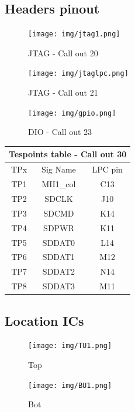 \subsection{Headers pinout}

		\begin{figure}[htbp!]
			\centering
			\texttt{[image: img/jtag1.png]}\\
			\caption{JTAG - Call out 20}
		\end{figure}

		\begin{figure}[htbp!]
			\centering
			\texttt{[image: img/jtaglpc.png]}\\
			\caption{JTAG - Call out  21}
		\end{figure}
		
		\begin{figure}[htbp!]
			\centering
			\texttt{[image: img/gpio.png]}\\
			\caption{DIO - Call out 23}
		\end{figure}

\clearpage


\begin{longtable}{|c|c|c|} \hline
		\multicolumn{3}{|c|}{Tespoints table - Call out 30}\\ \hline
	TPx & Sig Name & LPC pin \\ \hline
	TP1 & MII1\_col & C13 \\ \hline
	TP2 & SDCLK & J10 \\ \hline
	TP3 & SDCMD & K14 \\ \hline
	TP4 & SDPWR & K11 \\ \hline
	TP5 & SDDAT0 & L14 \\ \hline
	TP6 & SDDAT1 & M12 \\ \hline
	TP7 & SDDAT2 & N14 \\ \hline
	TP8 & SDDAT3 & M11 \\ \hline
	
\end{longtable}	


\subsection{Location ICs}

		\begin{figure}[htbp!]
			\centering
			\texttt{[image: img/TU1.png]}\\
			\caption{Top}
		\end{figure}
		\begin{figure}[htbp!]
			\centering
			\texttt{[image: img/BU1.png]}\\
			\caption{Bot}
		\end{figure}
\clearpage

